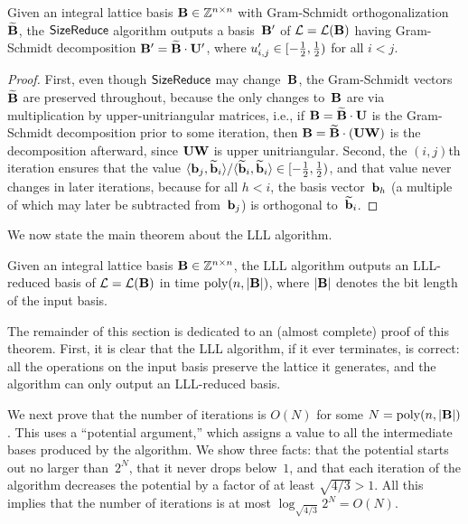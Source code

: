 \documentclass[11pt]{article}
\begin{document}
\begin{lemma}
  \label{lem:size-reduce-correct}
  Given an integral lattice basis $\mathbf{B} \in \mathbb{Z}^{n \times n}$ with
  Gram-Schmidt orthogonalization $\widetilde{\mathbf{B}}$, the $\mathsf{SizeReduce}$
  algorithm outputs a basis~$\mathbf{B}'$ of $\mathcal{L} = \mathcal{L}(\mathbf{B})$ having
  Gram-Schmidt decomposition $\mathbf{B}' = \widetilde{\mathbf{B}} \cdot \mathbf{U}'$, where
  $u'_{i,j} \in [-\tfrac12,\tfrac12)$ for all $i<j$.
\end{lemma}

\begin{proof}
  First, even though $\mathsf{SizeReduce}$ may change~$\mathbf{B}$, the
  Gram-Schmidt vectors~$\widetilde{\mathbf{B}}$ are preserved throughout, because
  the only changes to~$\mathbf{B}$ are via multiplication by
  upper-unitriangular matrices, i.e., if
  $\mathbf{B} = \widetilde{\mathbf{B}} \cdot \mathbf{U}$ is the Gram-Schmidt decomposition
  prior to some iteration, then
  $\mathbf{B} = \widetilde{\mathbf{B}} \cdot (\mathbf{U} \mathbf{W})$ is the decomposition
  afterward, since $\mathbf{U} \mathbf{W}$ is upper unitriangular. Second, the
  $(i,j)$th iteration ensures that the value
  $\langle\mathbf{b}_{j}, \widetilde{\mathbf{b}}_{i}\rangle/\langle\widetilde{\mathbf{b}}_{i},
    \widetilde{\mathbf{b}}_{i}\rangle \in [-\tfrac12,\tfrac12)$, and that value never changes in
  later iterations, because for all $h < i$, the basis
  vector~$\mathbf{b}_{h}$ (a multiple of which may later be subtracted
  from~$\mathbf{b}_{j}$) is orthogonal to~$\widetilde{\mathbf{b}}_{i}$.
\end{proof}

\noindent We now state the main theorem about the LLL algorithm.

\begin{theorem}
  \label{thm:lll}
  Given an integral lattice basis $\mathbf{B} \in \mathbb{Z}^{n \times n}$, the LLL
  algorithm outputs an LLL-reduced basis of $\mathcal{L} = \mathcal{L}(\mathbf{B})$ in
  time $\operatorname{poly}(n, \lvert\mathbf{B}\rvert)$, where $\lvert\mathbf{B}\rvert$ denotes the bit
  length of the input basis.
\end{theorem}

The remainder of this section is dedicated to an (almost complete)
proof of this theorem. First, it is clear that the LLL algorithm, if
it ever terminates, is correct: all the operations on the input basis
preserve the lattice it generates, and the algorithm can only output
an LLL-reduced basis.

We next prove that the number of iterations is $O(N)$ for some
$N=\operatorname{poly}(n, \lvert\mathbf{B}\rvert)$. This uses a ``potential argument,'' which
assigns a value to all the intermediate bases produced by the
algorithm. We show three facts: that the potential starts out no
larger than~$2^{N}$, that it never drops below~$1$, and that each
iteration of the algorithm decreases the potential by a factor of at
least $\sqrt{4/3} > 1$. All this implies that the number of iterations
is at most $\log_{\sqrt{4/3}} 2^{N} = O(N)$.
\end{document}
